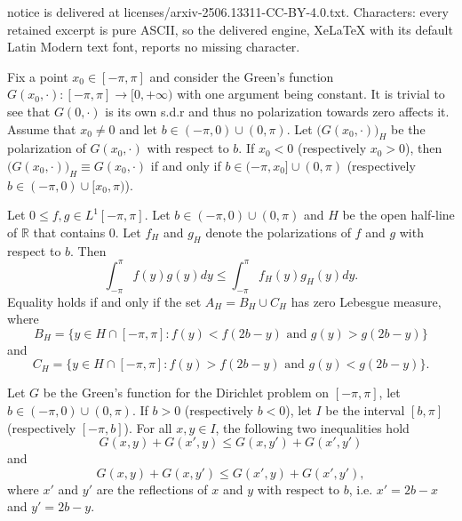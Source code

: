 \documentclass[10pt,a4paper]{amsart}
\begin{document}
notice is delivered at licenses/arxiv-2506.13311-CC-BY-4.0.txt. Characters: every retained excerpt is pure ASCII, so the delivered engine, XeLaTeX with its default Latin Modern text font, reports no missing character.
\begin{example}\label{paradeigma}\textnormal{
Fix a point \(x_0\in[-\pi,\pi]\) and consider the Green's function \(G(x_0,\cdot):[-\pi,\pi]\to[0,+\infty)\) with one argument being constant. It is trivial to see that \(G(0,\cdot)\) is its own s.d.r and thus no polarization towards zero affects it. Assume that \(x_0\neq0\) and let \(b\in(-\pi,0)\cup(0,\pi)\). Let \(\bigl(G(x_0,\cdot)\bigr)_H\) be the polarization of \(G(x_0,\cdot)\) with respect to \(b\). If \(x_0<0\) (respectively \(x_0>0\)), then \(\bigl(G(x_0,\cdot)\bigr)_H\equiv G(x_0,\cdot)\) if and only if \(b\in(-\pi,x_0]\cup(0,\pi)\) (respectively \(b\in(-\pi,0)\cup[x_0,\pi)\)).}
\end{example}

\begin{proposition}\label{hardy polar}
Let \(0\leq f,g\in L^1[-\pi,\pi]\). Let \(b\in(-\pi,0)\cup(0,\pi)\) and \(H\) be the open half-line of \(\mathbb{R}\) that contains 0. Let \(f_H\) and \(g_H\) denote the polarizations of \(f\) and \(g\) with respect to \(b\). Then
\[\int_{-\pi}^\pi f(y)g(y)dy\leq\int_{-\pi}^\pi f_H(y)g_H(y)dy.\]
Equality holds if and only if the set \(A_H=B_H\cup C_H\) has zero Lebesgue measure, where
\[B_H=\{y\in H\cap[-\pi,\pi]:f(y)<f(2b-y)\text{ and }g(y)>g(2b-y)\}\]
and
\[C_H=\{y\in H\cap[-\pi,\pi]:f(y)>f(2b-y)\text{ and }g(y)<g(2b-y)\}.\]
\end{proposition}

\begin{lemma}\label{karamata green}
Let \(G\) be the Green's function for the Dirichlet problem on \([-\pi,\pi]\), let \(b\in(-\pi,0)\cup(0,\pi)\). If \(b>0\) (respectively \(b<0\)), let \(I\) be the interval \([b,\pi]\) (respectively \([-\pi,b]\)). For all \(x,y\in I\), the following two inequalities hold
\begin{equation}\label{4.2}
G(x,y)+G(x',y)\leq G(x,y')+G(x',y')
\end{equation}
and
\begin{equation}\label{4.3}
G(x,y)+G(x,y')\leq G(x',y)+G(x',y'),
\end{equation}
where \(x'\) and \(y'\) are the reflections of \(x\) and \(y\) with respect to \(b\), i.e. \(x'=2b-x\) and \(y'=2b-y\).\\
\end{lemma}
\end{document}
